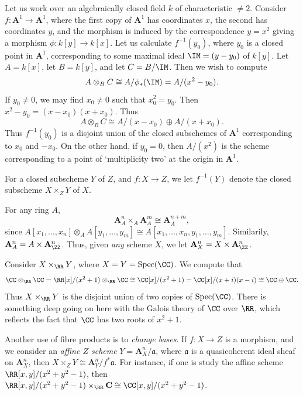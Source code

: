 \begin{example}
    Let us work over an algebraically closed field $k$ of characteristic $\neq 2$. Consider $f: \mathbf{A}^1 \to \mathbf{A}^1$, where the first copy of $\mathbf{A}^1$ has coordinates $x$, the second has coordinates $y$, and the morphism is induced by the correspondence $y = x^2$ giving a morphism $\phi: k[y] \to k[x]$. Let us calculate $f^{-1}(y_0)$, where $y_0$ is a closed point in $\mathbf{A}^1$, corresponding to some maximal ideal $\IM = (y - y_0)$ of $k[y]$. Let $A = k[x]$, let $B = k[y]$, and let $C = B/\IM$. Then we wish to compute
    \[ A \otimes_B C \cong A/\phi_*(\IM) = A/(x^2 - y_0). \]
    If $y_0 \neq 0$, we may find $x_0 \neq 0$ such that $x_0^2 = y_0$. Then $x^2 - y_0 = (x - x_0)(x + x_0)$. Thus
    \[ A \otimes_B C \cong A/(x - x_0) \oplus A/(x + x_0). \]
    Thus $f^{-1}(y_0)$ is a disjoint union of the closed subschemes of $\mathbf{A}^1$ corresponding to $x_0$ and $-x_0$. On the other hand, if $y_0 = 0$, then $A/(x^2)$ is the scheme corresponding to a point of `multiplicity two' at the origin in $\mathbf{A}^1$.
\end{example}

For a closed subscheme $Y$ of $Z$, and $f: X \to Z$, we let $f^{-1}(Y)$ denote the closed subscheme $X \times_Z Y$ of $X$.

\begin{example}
    For any ring $A$,
    \[ \mathbf{A}^n_A \times_A \mathbf{A}^m_A \cong \mathbf{A}^{n+m}_A, \]
    since $A[x_1,\dots,x_n] \otimes_A A[y_1,\dots,y_m] \cong A[x_1,\dots,x_n,y_1,\dots,y_m]$. Similarily, $\mathbf{A}^n_A = A \times \mathbf{A}^n_{\ZZ}$. Thus, given \emph{any} scheme $X$, we let $\mathbf{A}^n_X = X \times \mathbf{A}^n_{\ZZ}$.
\end{example}

\begin{example}
    Consider $X \times_{\RR} Y$, where $X = Y = \text{Spec}(\CC)$. We compute that
    \[ \CC \otimes_{\RR} \CC = \RR[x]/(x^2 + 1) \otimes_{\RR} \CC \cong \CC[x]/(x^2 + 1) = \CC[x]/(x + i)(x-i) \cong \CC \oplus \CC. \]
    Thus $X \times_{\RR} Y$ is the disjoint union of two copies of $\text{Spec}(\CC)$. There is something deep going on here with the Galois theory of $\CC$ over $\RR$, which reflects the fact that $\CC$ has two roots of $x^2 + 1$.
\end{example}

Another use of fibre products is to \emph{change bases}. If $f: X \to Z$ is a morphism, and we consider an \emph{affine $Z$ scheme} $Y = \mathbf{A}^n_X / \mathfrak{a}$, where $\mathfrak{a}$ is a quasicoherent ideal sheaf on $\mathbf{A}^n_X$, then $X \times_Z Y \cong \mathbf{A}^n_Y / f^* \mathfrak{a}$. For instance, if one is study the affine scheme $\RR[x,y]/(x^2 + y^2 - 1)$, then $\RR[x,y]/(x^2 + y^2 - 1) \times_{\RR} \mathbf{C} \cong \CC[x,y]/(x^2 + y^2 - 1)$.

